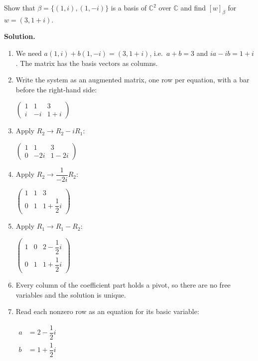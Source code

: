 \documentclass[11pt]{article}
\begin{document}
\begin{tcolorbox}[breakable,colback=white,colframe=ink!60,title={\bfseries Example 6 \textperiodcentered\ Coordinates in $\mathbb{C}^{2}$}]Show that $\beta=\{(1,i),(1,-i)\}$ is a basis of $\mathbb{C}^{2}$ over $\mathbb{C}$ and find $[w]_\beta$ for $w=(3,1+i)$.
\par\smallskip
\textbf{Solution.} \begin{enumerate}[leftmargin=1.6em,itemsep=1pt,topsep=2pt,label=\arabic*.]\item We need $a(1,i)+b(1,-i)=(3,1+i)$, i.e.\ $a+b=3$ and $ia-ib=1+i$. The matrix has the basis vectors as columns.
\item Write the system as an augmented matrix, one row per equation, with a bar before the right-hand side:\par\smallskip $\displaystyle \left(\begin{array}{cc|c}1 & 1 & 3 \\ i & -i & 1+i\end{array}\right)$
\item Apply $R_2\to R_2-iR_1$:\par\smallskip $\displaystyle \left(\begin{array}{cc|c}1 & 1 & 3 \\ 0 & -2i & 1-2i\end{array}\right)$
\item Apply $R_2\to \dfrac{1}{-2i} R_2$:\par\smallskip $\displaystyle \left(\begin{array}{cc|c}1 & 1 & 3 \\ 0 & 1 & 1+\dfrac{1}{2}i\end{array}\right)$
\item Apply $R_1\to R_1-R_2$:\par\smallskip $\displaystyle \left(\begin{array}{cc|c}1 & 0 & 2-\dfrac{1}{2}i \\ 0 & 1 & 1+\dfrac{1}{2}i\end{array}\right)$
\item Every column of the coefficient part holds a pivot, so there are no free variables and the solution is unique.
\item Read each nonzero row as an equation for its basic variable:\par\smallskip $\displaystyle\begin{aligned}a&=2-\dfrac{1}{2}i\\ b&=1+\dfrac{1}{2}i\end{aligned}$

\end{enumerate}
\end{tcolorbox}
\end{document}
